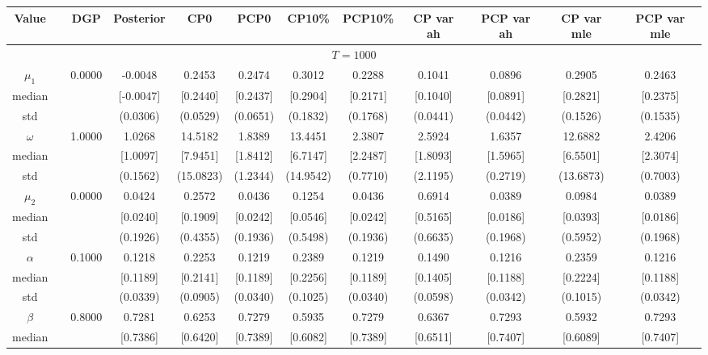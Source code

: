 { \renewcommand{\arraystretch}{1.2} 
\begin{sidewaystable} 
\center 
\begin{tabular}{cc cc| cccc| cccc} 
Value && DGP & Posterior & CP0  & PCP0 & CP10\%  & PCP10\% &CP var ah & PCP var ah & CP var mle & PCP var mle \\ \hline 
\hline 
\multicolumn{12}{c}{$T =1000$}  \\ 
\hline 
 \rowcolor{LightCyan} 
$\mu_{1}$&& 0.0000 & -0.0048 & 0.2453 & 0.2474 & 0.3012 & 0.2288 & 0.1041 & 0.0896 & 0.2905 & 0.2463  \\   
median &&  & [-0.0047] & [0.2440] & [0.2437] & [0.2904] & [0.2171] & [0.1040] & [0.0891] & [0.2821] & [0.2375]  \\ 
std &&   & (0.0306) & (0.0529) & (0.0651) & (0.1832) & (0.1768) &(0.0441) & (0.0442) & (0.1526) & (0.1535)  \\ 
 \rowcolor{LightCyan} 
$\omega$&& 1.0000 & 1.0268 & 14.5182 & 1.8389 & 13.4451 & 2.3807 & 2.5924 & 1.6357 & 12.6882 & 2.4206  \\   
median &&  & [1.0097] & [7.9451] & [1.8412] & [6.7147] & [2.2487] & [1.8093] & [1.5965] & [6.5501] & [2.3074]  \\ 
std &&   & (0.1562) & (15.0823) & (1.2344) & (14.9542) & (0.7710) &(2.1195) & (0.2719) & (13.6873) & (0.7003)  \\ 
 \rowcolor{LightCyan} 
$\mu_{2}$&& 0.0000 & 0.0424 & 0.2572 & 0.0436 & 0.1254 & 0.0436 & 0.6914 & 0.0389 & 0.0984 & 0.0389  \\   
median &&  & [0.0240] & [0.1909] & [0.0242] & [0.0546] & [0.0242] & [0.5165] & [0.0186] & [0.0393] & [0.0186]  \\ 
std &&   & (0.1926) & (0.4355) & (0.1936) & (0.5498) & (0.1936) &(0.6635) & (0.1968) & (0.5952) & (0.1968)  \\ 
 \rowcolor{LightCyan} 
$\alpha$&& 0.1000 & 0.1218 & 0.2253 & 0.1219 & 0.2389 & 0.1219 & 0.1490 & 0.1216 & 0.2359 & 0.1216  \\   
median &&  & [0.1189] & [0.2141] & [0.1189] & [0.2256] & [0.1189] & [0.1405] & [0.1188] & [0.2224] & [0.1188]  \\ 
std &&   & (0.0339) & (0.0905) & (0.0340) & (0.1025) & (0.0340) &(0.0598) & (0.0342) & (0.1015) & (0.0342)  \\ 
 \rowcolor{LightCyan} 
$\beta$&& 0.8000 & 0.7281 & 0.6253 & 0.7279 & 0.5935 & 0.7279 & 0.6367 & 0.7293 & 0.5932 & 0.7293  \\   
median &&  & [0.7386] & [0.6420] & [0.7389] & [0.6082] & [0.7389] & [0.6511] & [0.7407] & [0.6089] & [0.7407]  \\ 

\end{tabular}
\end{sidewaystable}}

